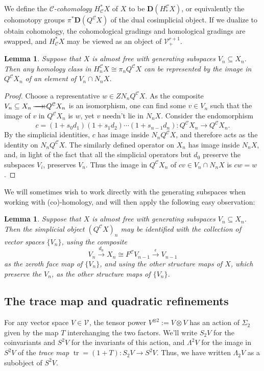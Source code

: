 \documentclass[11pt]{amsart}
\theoremstyle{plain}
\newtheorem{lem}[thm]{Lemma}
\theoremstyle{definition}
\DeclareMathOperator{\trace}{tr}
\renewcommand{\to}{\longrightarrow}
\newcommand{\calC}{\mathcal{C}}
\newcommand{\calV}{\mathcal{V}}
\newcommand{\calc}{\mathcal{C}}
\theoremstyle{plain}
\newcommand{\vect}[2]{\calV^{#1}_{#2}}
\newcommand{\epi}{{\,\makebox[0cm][l]{\ensuremath\to}\to}}
\newcommand{\dual}{\mathbf{D}}
\begin{document}
\begin{Conventions and notation}
We define the \emph{$\calC$-cohomology} $H^*_\calC X$ of $X$ to be $\dual(H_*^\calC X)$, or equivalently the cohomotopy groups $\pi^*\dual(Q^\calC X)$ of the dual cosimplicial object.  If we dualize to obtain cohomology, the cohomological gradings and homological gradings are swapped, and $H^*_{\calC}X$ may be viewed as an object of $\vect{r+1}{+}$. 
\begin{lem}\label{lemma on homology class repd by normalized generator}
Suppose that $X$ is almost free with generating subspaces $V_n\subseteq X_n$. Then any homology class in $H_n^{\calC}X\cong \pi_nQ^{\calC}X$ can be represented by the image in $Q^{\calC}X_n$ of an element of $V_n\cap N_nX$.
\end{lem}
\begin{proof}
Choose a representative $w\in ZN_nQ^\calC X$. As the composite $V_n\subseteq X_n\epi Q^\calC X_n$ is an isomorphism, one can find some $v\in V_n$ such that the image of $v$ in $Q^\calC X_n$ is $w$, yet $v$ needn't lie in $N_nX$. Consider the endomorphism
\[c=(1+s_0d_1)(1+s_1d_2)\cdots (1+s_{n-1}d_n):Q^\calC X_n\to Q^\calC X_n.\]
By the simplicial identities, $c$ has image inside $N_n Q^\calC X$, and therefore acts as the identity on $N_nQ^\calC X$. The similarly defined operator on $X_n$ has image inside $N_n X$, and, in light of the fact that all the simplicial operators but $d_0$ preserve the subspaces $V_i$, preserves $V_n$. Thus the image in $Q^\calC X_n$ of $cv\in V_n\cap N_n X$ is $cw=w$.
\end{proof}
We will sometimes wish to work directly with the generating subspaces when working with (co)-homology, and will then apply the following easy observation:
\begin{lem}\label{identify almost free indecs with gens}
Suppose that $X$ is almost free with generating subspaces $V_n\subseteq X_n$. Then the simplicial object $(Q^{\calc}X)_{n}$ may be identified with the collection of vector spaces $\{V_n\}$, using  the composite
\[V_{n}\overset{d_0}{\to}X_n\cong F^{\calc}V_{n-1}\overset{\epsilon}{\to}V_{n-1}\]
as the zeroth face map of $\{V_n\}$, and using the other structure maps of $X$, which preserve the $V_{n}$, as the other structure maps of $\{V_n\}$.
\end{lem}



\subsection{The trace map and quadratic refinements}
For any vector space $V\in \vect{}{}$, the tensor power $V^{\otimes2}:=V\otimes V$ has an action of $\Sigma_2$ given by the map $T$ interchanging the two factors. We'll write $S_2V$ for the coinvariants and $S^2V$ for the invariants of this action, and $\Lambda^2V$ for the image in $S^2V$ of the \emph{trace map} $\trace=(1+T):S_2V\to S^2V$. Thus, we have written $\Lambda_2V$ as a subobject of $S^2V$.


\end{Conventions and notation}
\end{document}
